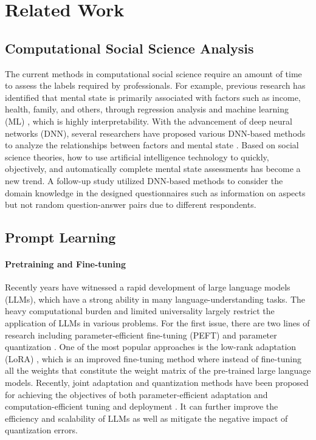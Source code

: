 \section{Related Work}
\subsection{Computational Social Science Analysis}
The current methods in computational social science require an amount of time to assess the labels required by professionals. For example, previous research has identified that mental state is primarily associated with factors such as income, health, family, and others, through regression analysis and machine learning (ML) \cite{Saputri_2015,Yu_2017,Laaksonen_2018}, which is highly interpretability. With the advancement of deep neural networks (DNN), several researchers have proposed various DNN-based methods to analyze the relationships between factors and mental state \cite{Weizhao2019,ijcai2022_Lilin}. Based on social science theories, how to use artificial intelligence technology to quickly, objectively, and automatically complete mental state assessments has become a new trend. A follow-up study \cite{TCSS_2025,ADMA2024} utilized DNN-based methods to consider the domain knowledge in the designed questionnaires such as information on aspects but not random question-answer pairs due to different respondents. 

\subsection{Prompt Learning}


\paragraph{Pretraining and Fine-tuning}
Recently years have witnessed a rapid development of large language models (LLMs), which have a strong ability in many language-understanding tasks. The heavy computational burden and limited universality largely restrict the application of LLMs in various problems. For the first issue, there are two lines of research including parameter-efficient fine-tuning (PEFT) \cite{Parameter_Efficien_2022} and parameter quantization \cite{frantar2022optq,xiao2023smoothquant}. One of the most popular approaches is the low-rank adaptation (LoRA) \cite{LoRA_2022}, which is an improved fine-tuning method where instead of fine-tuning all the weights that constitute the weight matrix of the pre-trained large language models. Recently, joint adaptation and quantization methods have been proposed for achieving the objectives of both parameter-efficient adaptation and computation-efficient tuning and deployment \cite{QLoRA_2023,QA_LoRA_2024}. It can further improve the efficiency and scalability of LLMs as well as mitigate the negative impact of quantization errors. 

